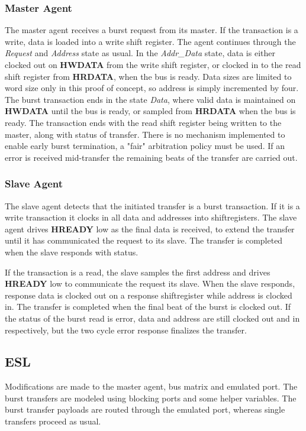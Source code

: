 \subsubsection{Master Agent}
The master agent receives a burst request from its master. If the transaction is a write, data is loaded into a write shift register. The agent continues through the \textit{Request} and \textit{Address} state as usual. In the \textit{Addr\_Data} state, data is either clocked out on \textbf{HWDATA} from the write shift register, or clocked in to the read shift register from \textbf{HRDATA}, when the bus is ready. Data sizes are limited to word size only in this proof of concept, so address is simply incremented by four. The burst transaction ends in the state \textit{Data}, where valid data is maintained on \textbf{HWDATA} until the bus is ready, or sampled from \textbf{HRDATA} when the bus is ready. The transaction ends with the read shift register being written to the master, along with status of transfer. There is no mechanism implemented to enable early burst termination, a "fair" arbitration policy must be used. If an error is received mid-transfer the remaining beats of the transfer are carried out. 

\subsubsection{Slave Agent}
The slave agent detects that the initiated transfer is a burst transaction. If it is a write transaction it clocks in all data and addresses into shiftregisters. The slave agent drives \textbf{HREADY} low as the final data is received, to extend the transfer until it has communicated the request to its slave. The transfer is completed when the slave responds with status. \par
If the transaction is a read, the slave samples the first address and drives \textbf{HREADY} low to communicate the request its slave. When the slave responds, response data is clocked out on a response shiftregister while address is clocked in. The transfer is completed when the final beat of the burst is clocked out. If the status of the burst read is error, data and address are still clocked out and in respectively, but the two cycle error response finalizes the transfer.  


\subsection{ESL}
Modifications are made to the master agent, bus matrix and emulated port. The burst transfers are modeled using blocking ports and some helper variables. The burst transfer payloads are routed through the emulated port, whereas single transfers proceed as usual.

